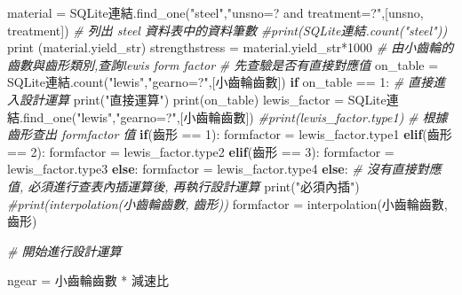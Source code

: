 \documentclass[]{article}
\newenvironment{Shaded}{}{}
\newcommand{\KeywordTok}[1]{\textcolor[rgb]{0.00,0.44,0.13}{\textbf{{#1}}}}
\newcommand{\DataTypeTok}[1]{\textcolor[rgb]{0.56,0.13,0.00}{{#1}}}
\newcommand{\DecValTok}[1]{\textcolor[rgb]{0.25,0.63,0.44}{{#1}}}
\newcommand{\StringTok}[1]{\textcolor[rgb]{0.25,0.44,0.63}{{#1}}}
\newcommand{\CommentTok}[1]{\textcolor[rgb]{0.38,0.63,0.69}{\textit{{#1}}}}
\newcommand{\NormalTok}[1]{{#1}}
\begin{document}
\begin{Shaded}
\begin{Highlighting}[]
    \NormalTok{material = SQLite連結.find_one(}\StringTok{"steel"}\NormalTok{,}\StringTok{"unsno=? and treatment=?"}\NormalTok{,[unsno, treatment])}
    \CommentTok{# 列出 steel 資料表中的資料筆數}
    \CommentTok{#print(SQLite連結.count("steel"))}
    \DataTypeTok{print} \NormalTok{(material.yield_str)}
    \NormalTok{strengthstress = material.yield_str*}\DecValTok{1000}
    \CommentTok{# 由小齒輪的齒數與齒形類別,查詢lewis form factor}
    \CommentTok{# 先查驗是否有直接對應值}
    \NormalTok{on_table = SQLite連結.count(}\StringTok{"lewis"}\NormalTok{,}\StringTok{"gearno=?"}\NormalTok{,[小齒輪齒數])}
    \KeywordTok{if} \NormalTok{on_table == }\DecValTok{1}\NormalTok{:}
        \CommentTok{# 直接進入設計運算}
        \DataTypeTok{print}\NormalTok{(}\StringTok{"直接運算"}\NormalTok{)}
        \DataTypeTok{print}\NormalTok{(on_table)}
        \NormalTok{lewis_factor = SQLite連結.find_one(}\StringTok{"lewis"}\NormalTok{,}\StringTok{"gearno=?"}\NormalTok{,[小齒輪齒數])}
        \CommentTok{#print(lewis_factor.type1)}
        \CommentTok{# 根據齒形查出 formfactor 值}
        \KeywordTok{if}\NormalTok{(齒形 == }\DecValTok{1}\NormalTok{):}
            \NormalTok{formfactor = lewis_factor.type1}
        \KeywordTok{elif}\NormalTok{(齒形 == }\DecValTok{2}\NormalTok{):}
            \NormalTok{formfactor = lewis_factor.type2}
        \KeywordTok{elif}\NormalTok{(齒形 == }\DecValTok{3}\NormalTok{):}
            \NormalTok{formfactor = lewis_factor.type3}
        \KeywordTok{else}\NormalTok{:}
            \NormalTok{formfactor = lewis_factor.type4}
    \KeywordTok{else}\NormalTok{:}
        \CommentTok{# 沒有直接對應值, 必須進行查表內插運算後, 再執行設計運算}
        \DataTypeTok{print}\NormalTok{(}\StringTok{"必須內插"}\NormalTok{)}
        \CommentTok{#print(interpolation(小齒輪齒數, 齒形))}
        \NormalTok{formfactor = interpolation(小齒輪齒數, 齒形)}

    \CommentTok{# 開始進行設計運算}

    \NormalTok{ngear = 小齒輪齒數 * 減速比}


\end{Highlighting}
\end{Shaded}
\end{document}
